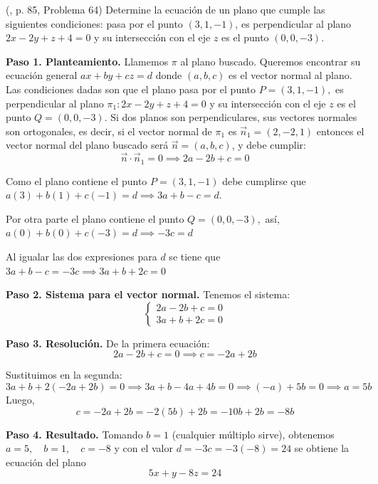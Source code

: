 \begin{prob} (\cite{espinoza2006Algebralineal}, p. 85, Problema 64) Determine la ecuación de un plano que cumple las siguientes condiciones: pasa por el punto $(3,1,-1)$, es perpendicular al plano $2x-2y+z+4=0$ y su intersección con el eje $z$ es el punto $(0,0,-3)$. 

\begin{myproof}
\textbf{Paso 1. Planteamiento.} Llamemos $\pi$ al plano buscado. Queremos encontrar su ecuación general \(
ax + by + cz = d \) donde $(a,b,c)$ es el vector normal al plano. Las condiciones dadas son que el plano pasa por el punto $P = (3,1,-1), $ es perpendicular al plano $\pi_1: 2x-2y+z+4=0$ y su intersección con el eje $z$ es el punto $Q = (0,0,-3)$. Si dos planos son perpendiculares, sus vectores normales son ortogonales, es decir, si el vector normal de $\pi_1$ es $\vec{n}_1 = (2,-2,1)$ entonces el vector normal del plano buscado será $\vec{n} = (a,b,c)$, y debe cumplir:
\[
\vec{n} \cdot \vec{n}_1 = 0 \implies 2a - 2b + c = 0
\]

Como el plano contiene el punto $P = (3,1,-1)$ debe cumplirse que \(
a(3) + b(1) + c(-1) = d \implies 3a + b - c = d.\)

Por otra parte el plano contiene el punto $Q = (0,0,-3),$ así, \(a(0) + b(0) + c(-3) = d \implies -3c = d \)

Al igualar las dos expresiones para $d$ se tiene que \(3a + b - c = -3c \implies 3a + b + 2c = 0 \)

\textbf{Paso 2. Sistema para el vector normal.} Tenemos el sistema:
\[
\begin{cases}
2a - 2b + c = 0 \\
3a + b + 2c = 0
\end{cases}
\]


\textbf{Paso 3. Resolución.} De la primera ecuación:
\[
2a - 2b + c = 0 \implies c = -2a + 2b
\]

Sustituimos en la segunda:
\[
3a + b + 2(-2a + 2b) = 0 \implies 3a + b -4a + 4b = 0 \implies
(-a) + 5b = 0 \implies a = 5b
\]
Luego,
\[
c = -2a + 2b = -2(5b) + 2b = -10b + 2b = -8b
\]

\textbf{Paso 4. Resultado.} Tomando $b = 1$ (cualquier múltiplo sirve), obtenemos \(a = 5,\quad b = 1,\quad c = -8 \) y con el valor \(d = -3c = -3(-8) = 24\) se obtiene la ecuación del plano 
\[
\boxed{5x + y - 8z = 24}
\]
\end{myproof}

\end{prob}

